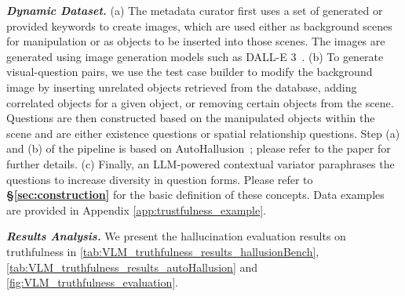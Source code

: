 \textbf{\textit{Dynamic Dataset.}} 
(a) The metadata curator first uses a set of generated or provided keywords to create images, which are used either as background scenes for manipulation or as objects to be inserted into those scenes. The images are generated using image generation models such as DALL-E 3~\cite{dalle3}.
(b) To generate visual-question pairs, we use the test case builder to modify the background image by inserting unrelated objects retrieved from the database, adding correlated objects for a given object, or removing certain objects from the scene. Questions are then constructed based on the manipulated objects within the scene and are either existence questions or spatial relationship questions.
Step (a) and (b) of the pipeline is based on AutoHallusion~\cite{AutoHallusion}; please refer to the paper for further details.
(c) Finally, an LLM-powered contextual variator paraphrases the questions to increase diversity in question forms. Please refer to \textbf{\S\ref{sec:construction}} for the basic definition of these concepts. Data examples are provided in Appendix \ref{app:trustfulness_example}.


\textbf{\textit{Results Analysis.}} We present the hallucination evaluation results on truthfulness in \autoref{tab:VLM_truthfulness_results_hallusionBench}, \autoref{tab:VLM_truthfulness_results_autoHallusion} and \autoref{fig:VLM_truthfulness_evaluation}.



